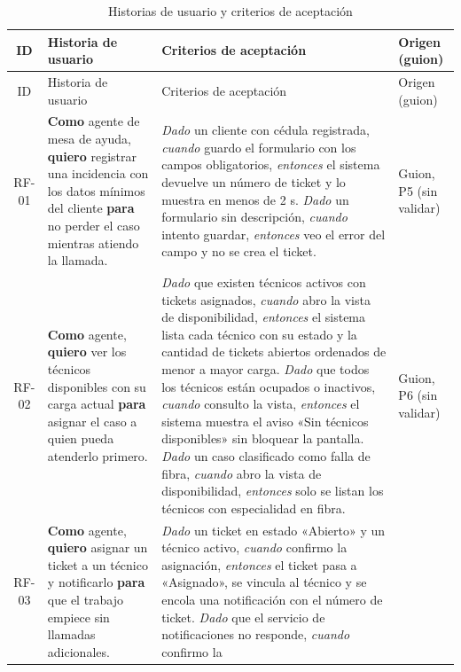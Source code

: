 \begin{longtable}{@{}c p{4.2cm} p{5.3cm} p{3.3cm}@{}}
\caption{Historias de usuario y criterios de aceptación}
\label{tab:rf}\\
\toprule
ID & Historia de usuario & Criterios de aceptación & Origen (guion) \\
\midrule
\endfirsthead
\toprule
ID & Historia de usuario & Criterios de aceptación & Origen (guion) \\
\midrule
\endhead
\bottomrule
\endfoot
RF-01 & \textbf{Como} agente de mesa de ayuda, \textbf{quiero} registrar una incidencia con los
datos mínimos del cliente \textbf{para} no perder el caso mientras atiendo la llamada.
& \emph{Dado} un cliente con cédula registrada, \emph{cuando} guardo el formulario con los campos
obligatorios, \emph{entonces} el sistema devuelve un número de ticket y lo muestra en menos de 2 s.
\newline \emph{Dado} un formulario sin descripción, \emph{cuando} intento guardar, \emph{entonces}
veo el error del campo y no se crea el ticket.
& Guion, P5 (sin validar) \\
\addlinespace
RF-02 & \textbf{Como} agente, \textbf{quiero} ver los técnicos disponibles con su carga actual
\textbf{para} asignar el caso a quien pueda atenderlo primero.
& \emph{Dado} que existen técnicos activos con tickets asignados, \emph{cuando} abro la vista de
disponibilidad, \emph{entonces} el sistema lista cada técnico con su estado y la cantidad de tickets
abiertos ordenados de menor a mayor carga.
\newline \emph{Dado} que todos los técnicos están ocupados o inactivos, \emph{cuando} consulto la
vista, \emph{entonces} el sistema muestra el aviso «Sin técnicos disponibles» sin bloquear la pantalla.
\newline \emph{Dado} un caso clasificado como falla de fibra, \emph{cuando} abro la vista de
disponibilidad, \emph{entonces} solo se listan los técnicos con especialidad en fibra.
& Guion, P6 (sin validar) \\
\addlinespace
RF-03 & \textbf{Como} agente, \textbf{quiero} asignar un ticket a un técnico y notificarlo
\textbf{para} que el trabajo empiece sin llamadas adicionales.
& \emph{Dado} un ticket en estado «Abierto» y un técnico activo, \emph{cuando} confirmo la asignación,
\emph{entonces} el ticket pasa a «Asignado», se vincula al técnico y se encola una notificación con
el número de ticket.
\newline \emph{Dado} que el servicio de notificaciones no responde, \emph{cuando} confirmo la

\end{longtable}
